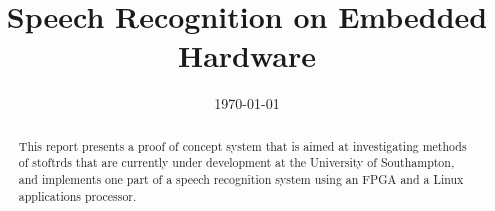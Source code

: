 \documentclass{ecsreport}     			%
\begin{document}
\frontmatter
\title      {Speech Recognition on Embedded Hardware}
\addresses  {\groupname\\\deptname\\\univname}
\date       {\today}
\subject    {}
\keywords   {}
\maketitle
\begin{abstract}  %
This report presents a proof of concept system that is aimed at investigating methods of stoftrds that are currently under development at the University of Southampton, and implements one part of a speech recognition system using an FPGA and a Linux applications processor.
\end{abstract}
\tableofcontents
\mainmatter


%
\backmatter

\end{document}
